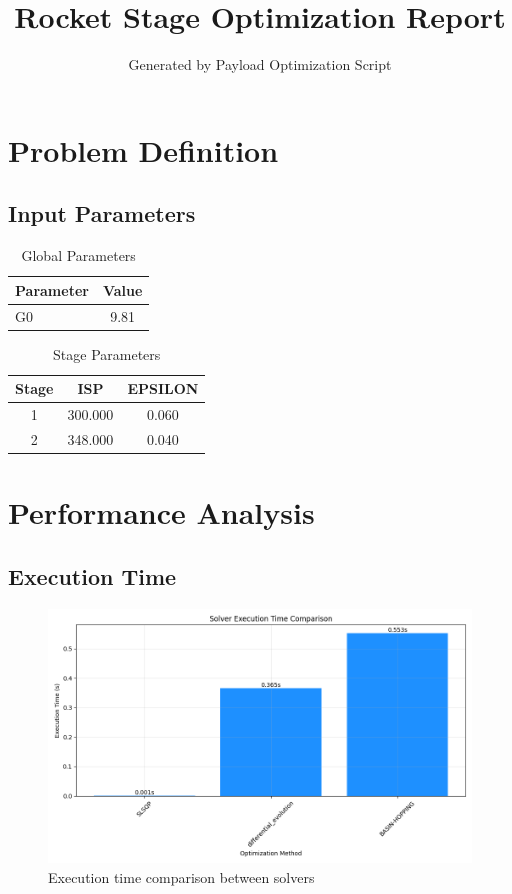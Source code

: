 \documentclass{article}
\begin{document}
\title{Rocket Stage Optimization Report}
\author{Generated by Payload Optimization Script}
\maketitle

\section{Problem Definition}
\subsection{Input Parameters}
\begin{table}[H]
\centering
\caption{Global Parameters}
\begin{tabular}{lc}
\toprule
Parameter & Value \\
\midrule
G0 & 9.81 \\
\bottomrule
\end{tabular}
\end{table}

\begin{table}[H]
\centering
\caption{Stage Parameters}
\begin{tabular}{ccc}
\toprule
Stage & ISP & EPSILON \\
\midrule
1 & 300.000 & 0.060 \\
2 & 348.000 & 0.040 \\
\bottomrule
\end{tabular}
\end{table}

\section{Performance Analysis}
\subsection{Execution Time}
\begin{figure}[H]
\centering
\includegraphics[width=\textwidth]{execution_time.png}
\caption{Execution time comparison between solvers}
\end{figure}
\end{document}
